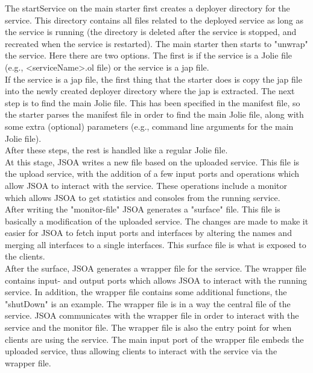 \documentclass[12pt,a4paper]{article}
\begin{document}
The startService on the main starter first creates a deployer directory for the service. This directory contains all files related to the deployed service as long as the service is running (the directory is deleted after the service is stopped, and recreated when the service is restarted). The main starter then starts to "unwrap" the service. Here there are two options. The first is if the service is a Jolie file (e.g., \textless serviceName\textgreater .ol file) or the service is a jap file. \\
If the service is a jap file, the first thing that the starter does is copy the jap file into the newly created deployer directory where the jap is extracted. The next step is to find the main Jolie file. This has been specified in the manifest file, so the starter parses the manifest file in order to find the main Jolie file, along with some extra (optional) parameters (e.g., command line arguments for the main Jolie file).  \\
After these steps, the rest is handled like a regular Jolie file. \\

At this stage, JSOA writes a new file based on the uploaded service. This file is the upload service, with the addition of a few input ports and operations which allow JSOA to interact with the service. These operations include a monitor which allows JSOA to get statistics and consoles from the running service. \\
After writing the "monitor-file" JSOA generates a "surface" file. This file is basically a modification of the uploaded service. The changes are made to make it easier for JSOA to fetch input ports and interfaces by altering the names and merging all interfaces to a single interfaces. This surface file is what is exposed to the clients. \\

After the surface, JSOA generates a wrapper file for the service. The wrapper file contains input- and output ports which allows JSOA to interact with the running service. In addition, the wrapper file contains some additional functions, the "shutDown" is an example. The wrapper file is in a way the central file of the service. JSOA communicates with the wrapper file in order to interact with the service and the monitor file. The wrapper file is also the entry point for when clients are using the service. The main input port of the wrapper file embeds the uploaded service, thus allowing clients to interact with the service via the wrapper file.\\
\end{document}
